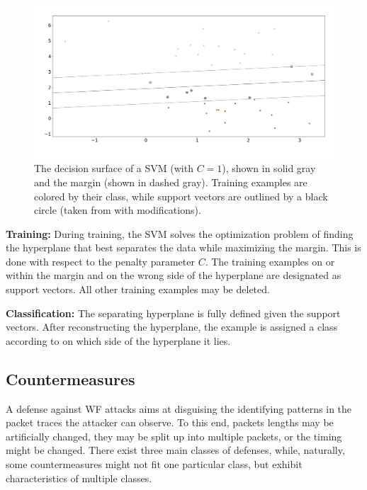 \documentclass[
	ruledheaders=chapter,
	class=report,
	thesis={type=master, department=inf},
	accentcolor=1c,
	custommargins=true,
	marginpar=false,
	parskip=half-,
	fontsize=11pt,
]{tudapub}
\begin{document}
	\begin{figure}[tb]
		\centering
		\includegraphics[width=\textwidth]{svm.png}
		\caption{The decision surface of a SVM (with $C = 1$), shown in solid gray and the margin (shown in dashed gray). Training examples are colored by their class, while support vectors are outlined by a black circle (taken from \cite{sklearn-linearSvc} with modifications).}
		\label{fig:svm}
	\end{figure}

	\textbf{Training:} During training, the SVM solves the optimization problem of finding the hyperplane that best separates the data while maximizing the margin. This is done with respect to the penalty parameter $C$. The training examples on or within the margin and on the wrong side of the hyperplane are designated as support vectors. All other training examples may be deleted.
	
	\textbf{Classification:} The separating hyperplane is fully defined given the support vectors. After reconstructing the hyperplane, the example is assigned a class according to on which side of the hyperplane it lies.

	\subsection{Countermeasures}
	\label{theoretical:defenses}

	A defense against WF attacks aims at disguising the identifying patterns in the packet traces the attacker can observe. To this end, packets lengths may be artificially changed, they may be split up into multiple packets, or the timing might be changed. There exist three main classes of defenses, while, naturally, some countermeasures might not fit one particular class, but exhibit characteristics of multiple classes.
	
\end{document}
